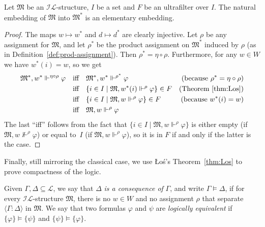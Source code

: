 \documentclass[submission,copyright,creativecommons]{eptcs}
\newcommand{\mo}{\mathfrak}
\renewcommand{\phi}{\varphi}
\renewcommand{\iff}{\quad\text{iff}\quad}
\newcommand{\IL}{\mathscr{I\!\!L}}   %
\newcommand{\LL}{\mathcal{L}}        %
\newcommand{\consec}[2]{\langle #1:#2 \rangle}
\newcommand{\satisfySym}{\Vdash}
\newcommand{\satisfy}[4]{#1, #2 \satisfySym^{#4} #3}
\newcommand{\notsatisfy}[4]{#1, #2 \not\Vdash^{#4} #3}
\begin{document}
\begin{proposition}\label{prop:ultra-embedding}
  Let $\mo{M}$ be an $\IL$-structure, $I$ be a set and $F$ be an ultrafilter over $I$.
  The natural embedding of $\mo{M}$ into $\mo{M}^*$ is an elementary embedding.
\end{proposition}
\begin{proof}
  The maps $w \mapsto w^*$ and $d \mapsto d^*$ are clearly injective.
%
  Let $\rho$ be any assignment for $\mo{M}$, and let
  $\rho^*$ be the product assignment on $\mo{M}^*$ induced by $\rho$
  (as in Definition~\ref{def:prod-assignment}).
  Then $\rho^* = \eta \circ \rho$.
  Furthermore, for any $w \in W$ we have $w^*(i) = w$,
  so we get
  \begin{align*}
    \satisfy{\mo{M}^*}{w^*}{\phi}{\eta \circ \rho}
      &\iff \satisfy{\mo{M}^*}{w^*}{\phi}{\rho^*}
      &\text{(because $\rho^* = \eta \circ \rho$)} \\
      &\iff \{ i \in I \mid \satisfy{\mo{M}}{w^*(i)}{\phi}{\rho} \} \in F
      &\text{(Theorem~\ref{thm:Los})} \\
      &\iff \{ i \in I \mid \satisfy{\mo{M}}{w}{\phi}{\rho} \} \in F
      &\text{(because $w^*(i) = w$)} \\
      &\iff \satisfy{\mo{M}}{w}{\phi}{\rho}
  \end{align*}
  The last ``iff'' follows from the fact that
  $\{ i \in I \mid \satisfy{\mo{M}}{w}{\phi}{\rho} \}$ is either
  empty (if $\notsatisfy{\mo{M}}{w}{\phi}{\rho}$)
  or equal to~$I$ (if $\satisfy{\mo{M}}{w}{\phi}{\rho}$),
  so it is in $F$ if and only if the latter is the case.
\end{proof}

  Finally, still mirroring the classical case,
  we use \L{}o{\'s}'s Theorem~\ref{thm:Los} to prove compactness of the logic.

\begin{definition}
  Given $\Gamma,\Delta \subseteq \LL$, we say that $\Delta$
  \emph{is a consequence of} $\Gamma$, and write $\Gamma\models \Delta$,
  if for every $\IL$-structure $\mo{M}$, 
  there is no $w \in W$ and no assignment $\rho$ 
  that separate $\consec{\Gamma}{\Delta}$ in $\mo{M}$.
%
  We say that two formulas $\varphi$ and $\psi$ are \emph{logically equivalent} if $\{\varphi\}\models \{\psi\}$ and $\{\psi\}\models \{\varphi\}$. 
\end{definition}
\end{document}
